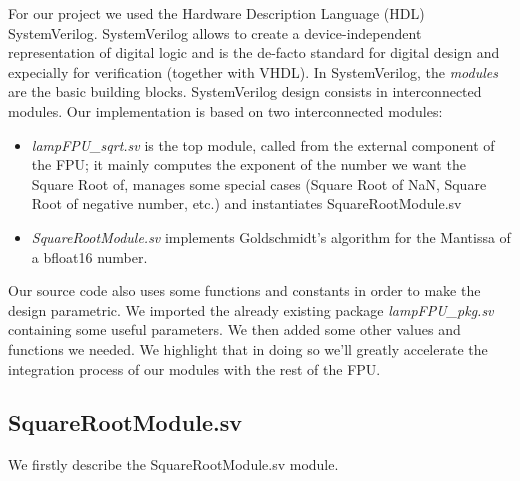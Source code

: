 For our project we used the Hardware Description Language (HDL) SystemVerilog. SystemVerilog allows to create a device-independent representation of digital logic and is the de-facto standard for digital design and expecially for verification (together with VHDL). 
In SystemVerilog, the \emph{modules} are the basic building blocks. SystemVerilog design consists in interconnected modules.
Our implementation is based on two interconnected modules:

\begin{itemize}
\item \emph{lampFPU\_sqrt.sv} is the top module, called from the external component of the FPU; it mainly computes the exponent of the number we want the Square Root of, manages some special cases (Square Root of NaN, Square Root of negative number, etc.) and instantiates SquareRootModule.sv
\item \emph{SquareRootModule.sv} implements Goldschmidt's algorithm for the Mantissa of a bfloat16 number. 
\end{itemize}

Our source code also uses some functions and constants in order to make the design parametric. We imported the already existing package \emph{lampFPU\_pkg.sv} containing some useful parameters. We then added some other values and functions we needed. We highlight that in doing so we'll greatly accelerate the integration process of our modules with the rest of the FPU. 

\subsection{SquareRootModule.sv}
We firstly describe the SquareRootModule.sv module. 
%

